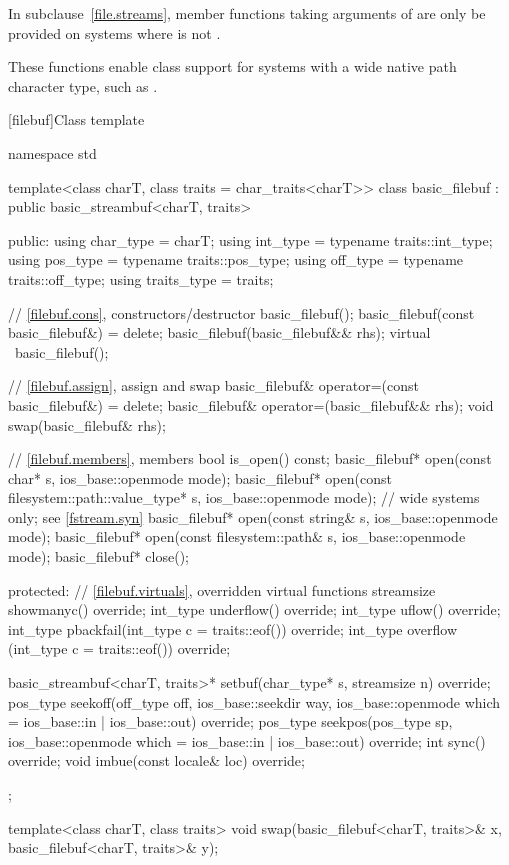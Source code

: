 \pnum
In subclause~\ref{file.streams}, member functions taking arguments of 
are only be provided on systems where  is not .
\begin{note}
These functions enable class  support for systems with a wide native path character type, such as .
\end{note}

[filebuf]{Class template }

%
\begin{codeblock}
namespace std {
  template<class charT, class traits = char_traits<charT>>
  class basic_filebuf : public basic_streambuf<charT, traits> {
  public:
    using char_type   = charT;
    using int_type    = typename traits::int_type;
    using pos_type    = typename traits::pos_type;
    using off_type    = typename traits::off_type;
    using traits_type = traits;

    // \ref{filebuf.cons}, constructors/destructor
    basic_filebuf();
    basic_filebuf(const basic_filebuf&) = delete;
    basic_filebuf(basic_filebuf&& rhs);
    virtual ~basic_filebuf();

    // \ref{filebuf.assign}, assign and swap
    basic_filebuf& operator=(const basic_filebuf&) = delete;
    basic_filebuf& operator=(basic_filebuf&& rhs);
    void swap(basic_filebuf& rhs);

    // \ref{filebuf.members}, members
    bool is_open() const;
    basic_filebuf* open(const char* s, ios_base::openmode mode);
    basic_filebuf* open(const filesystem::path::value_type* s,
                        ios_base::openmode mode);   // wide systems only; see \ref{fstream.syn}
    basic_filebuf* open(const string& s,
                        ios_base::openmode mode);
    basic_filebuf* open(const filesystem::path& s,
                        ios_base::openmode mode);
    basic_filebuf* close();

  protected:
    // \ref{filebuf.virtuals}, overridden virtual functions
    streamsize showmanyc() override;
    int_type underflow() override;
    int_type uflow() override;
    int_type pbackfail(int_type c = traits::eof()) override;
    int_type overflow (int_type c = traits::eof()) override;

    basic_streambuf<charT, traits>* setbuf(char_type* s,
                                           streamsize n) override;
    pos_type seekoff(off_type off, ios_base::seekdir way,
                     ios_base::openmode which
                      = ios_base::in | ios_base::out) override;
    pos_type seekpos(pos_type sp,
                     ios_base::openmode which
                      = ios_base::in | ios_base::out) override;
    int      sync() override;
    void     imbue(const locale& loc) override;
  };

  template<class charT, class traits>
    void swap(basic_filebuf<charT, traits>& x,
              basic_filebuf<charT, traits>& y);
}
\end{codeblock}

